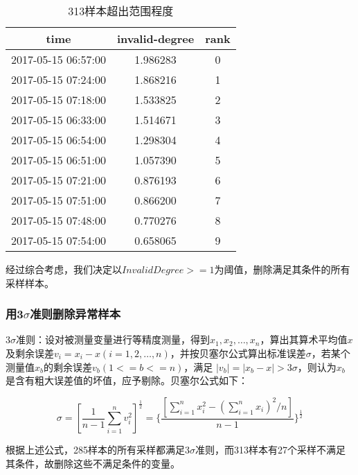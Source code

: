 \documentclass[bwprint]{gmcmthesis}
\begin{document}
\begin{table}[htb]
	\caption{313样本超出范围程度}\label{tab:001} \centering
	\begin{tabular}{ccc}
	\toprule[1.5pt]
	time &  invalid-degree &  rank \\
	\midrule[1pt]
	2017-05-15 06:57:00 &        1.986283 &     0 \\
	2017-05-15 07:24:00 &        1.868216 &     1 \\
	2017-05-15 07:18:00 &        1.533825 &     2 \\
	2017-05-15 06:33:00 &        1.514671 &     3 \\
	2017-05-15 06:54:00 &        1.298304 &     4 \\
	2017-05-15 06:51:00 &        1.057390 &     5 \\
	2017-05-15 07:21:00 &        0.876193 &     6 \\
	2017-05-15 07:51:00 &        0.866200 &     7 \\
	2017-05-15 07:48:00 &        0.770276 &     8 \\
	2017-05-15 07:54:00 &        0.658065 &     9 \\
	\bottomrule[1.5pt]
\end{tabular}
\end{table}


经过综合考虑，我们决定以$InvalidDegree >= 1$为阈值，删除满足其条件的所有采样样本。



\FloatBarrier
\subsubsection{用3$\sigma$准则删除异常样本}

3$\sigma$准则：设对被测量变量进行等精度测量，得到$x_1, x_2, \ldots, x_n$，算出其算术平均值$x$及剩余误差$v_i=x_i-x (i=1, 2, \ldots , n)$，并按贝塞尔公式算出标准误差$\sigma$，若某个测量值$x_b$的剩余误差$v_b ( 1 <= b <= n )$，满足 $|v_b| = | x_b - x | > 3\sigma$，则认为$x_b$是含有粗大误差值的坏值，应予剔除。贝塞尔公式如下：

\begin{equation}\label{eq:3sigma}
	\sigma = [\frac{1}{n-1}\sum_{i=1}^{n}v_i^2]^{\frac{1}{2}} = \{\frac{[\sum^n_{i=1}x_i^2 - (\sum^n_{i=1}x_i)^2/n]}{n-1}\}^{\frac{1}{2}}
\end{equation}

根据上述公式，285样本的所有采样都满足3$\sigma$准则，而313样本有27个采样不满足其条件，故删除这些不满足条件的变量。
\end{document}
